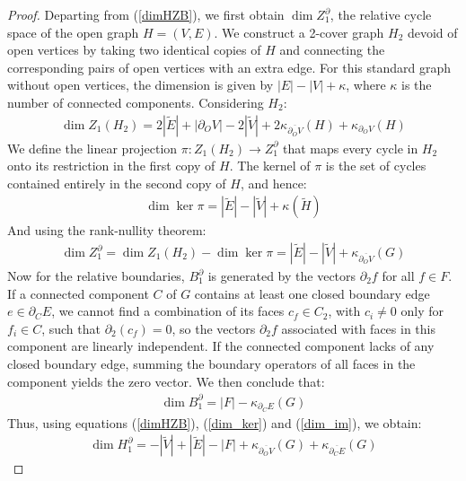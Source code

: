 \documentclass[12pt, twoside, openany]{book}
\begin{document}
\begin{proof}
    Departing from (\ref{dimHZB}), we first obtain $\dim Z_1^\partial$, the relative cycle space of the open graph $H = (V,E)$. We construct a 2-cover graph $H_2$ devoid of open vertices by taking two identical copies of $H$ and connecting the corresponding pairs of open vertices with an extra edge. For this standard graph without open vertices, the dimension is given by  $|E| - |V| + \kappa$, where $\kappa$ is the number of connected components. Considering $H_2$:
    \begin{align*}       
        \dim Z_1 (H_2) = 2|\tilde{E}| + |\partial_O V| - 2|\tilde{V}| + 2\kappa_{\overline{\partial_O V}}(H) + \kappa_{\partial_O V}(H)
    \end{align*}
    We define the linear projection $\pi : Z_1 (H_2) \rightarrow Z_1^\partial$ that maps every cycle in $H_2$ onto its restriction in the first copy of $H$. The kernel of $\pi$ is the set of cycles contained entirely in the second copy of $H$, and hence:
    \begin{align*}
        \dim \ker \pi = |\tilde{E}| - |\tilde{V}| + \kappa(\tilde{H})
    \end{align*}
    And using the rank-nullity theorem:
    \begin{align} \label{dim_ker}
        \dim Z_1^\partial = \dim Z_1 (H_2) - \dim \ker \pi =|\tilde{E}| - |\tilde{V}| + \kappa_{\overline{\partial_O V}}(G)
    \end{align}
    Now for the relative boundaries, $B_1^\partial$ is generated by the vectors $\partial_2 f$ for all $f \in F$. If a connected component $C$ of $G$ contains at least one closed boundary edge $e \in \partial_C E$, we cannot find a combination of its faces $c_f \in C_2$, with $c_i \neq 0$ only for $f_i \in C$, such that $\partial_2 (c_f) = 0$, so the vectors $\partial_2 f$ associated with faces in this component are linearly independent. If the connected component lacks of any closed boundary edge, summing the boundary operators of all faces in the component yields the zero vector. We then conclude that:
    \begin{align} \label{dim_im}
        \dim B_1^\partial = |F| - \kappa_{\partial_C E}(G)
    \end{align}
    Thus, using equations (\ref{dimHZB}), (\ref{dim_ker}) and (\ref{dim_im}), we obtain:
    \begin{align*}
    \dim H_1^\partial =-|\tilde{V}| + |\tilde{E}| - |F| + \kappa_{\overline{\partial_O V}}(G) + \kappa_{\overline{\partial_C E}}(G)
    \end{align*}
\end{proof}
\end{document}
